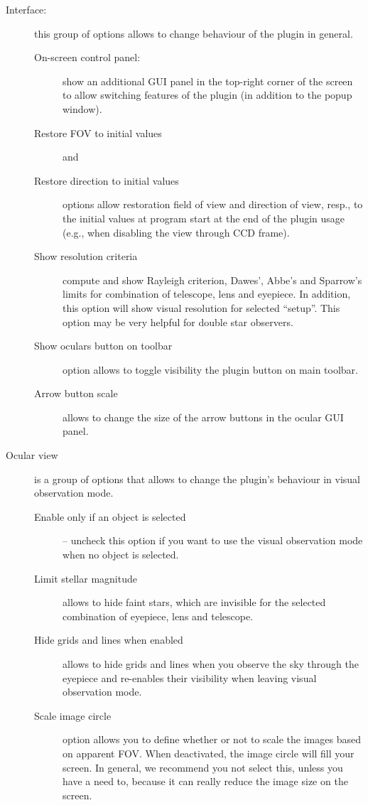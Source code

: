 \begin{description}
\item[Interface:] this group of options allows to change behaviour of the plugin in general.
 \begin{description}
   \item[On-screen control panel:] show an additional GUI panel in the top-right corner of the screen to allow switching features of the plugin (in addition to the popup window).
   \item[Restore FOV to initial values] and
   \item[Restore direction to initial values] options allow restoration field of view and direction of view, resp., 
         to the initial values at program start at the end of the plugin usage (e.g., when disabling the view through CCD frame).
   \item[Show resolution criteria] compute and show Rayleigh criterion, Dawes', Abbe's and Sparrow's limits for combination of telescope, lens and eyepiece.
         In addition, this option will show visual resolution for selected ``setup''. This option may be very helpful for double star observers.
   \item[Show oculars button on toolbar] option allows to toggle visibility the plugin button on main toolbar. 
   \item[Arrow button scale] allows to change the size of the arrow buttons in the ocular GUI panel. 
 \end{description}
\item[Ocular view] is a group of options that allows to change the plugin's behaviour in visual observation mode.
 \begin{description}
   \item[Enable only if an object is selected] -- uncheck this option if you want to use the visual observation mode when no object is selected.
   \item[Limit stellar magnitude] allows to hide faint stars, which are invisible for the selected combination of eyepiece, lens and telescope.
   \item[Hide grids and lines when enabled] allows to hide grids and lines when you observe the sky through the eyepiece and re-enables their visibility when leaving visual observation mode.
   \item[Scale image circle] option allows you to define whether or not to scale the images based on apparent FOV. When deactivated, the image circle will fill your screen. 
         In general, we recommend you not select this, unless you have a need to, because it can really reduce the image size on the screen. 

\end{description}
\end{description}

